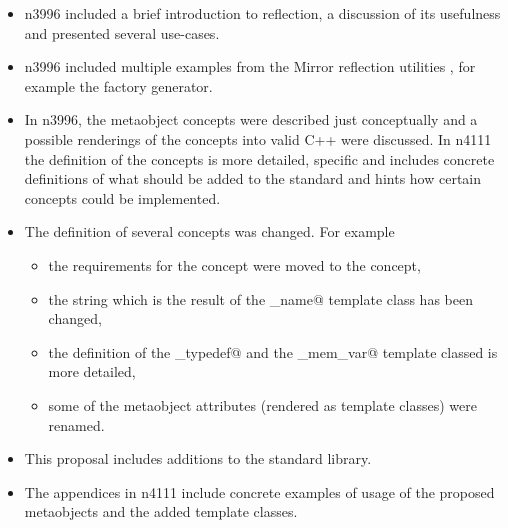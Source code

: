 \begin{itemize}
\item n3996 included a brief introduction to reflection, a discussion
of its usefulness and presented several use-cases.
\item n3996 included multiple examples from the Mirror reflection utilities
\cite{mirror-doc-cpp11}, for example the factory generator.
\item In n3996, the metaobject concepts were described just conceptually
and a possible renderings of the concepts into valid C++ were discussed.
In n4111 the definition of the concepts is more detailed, specific and includes
concrete definitions of what should be added to the standard and hints
how certain concepts could be implemented.
\item The definition of several concepts was changed. For example
  \begin{itemize}
  \item the requirements for the  concept were moved
  to the  concept,
  \item the string which is the result of the \verb@base_name@ template
  class has been changed,
  \item the definition of the \verb@named_typedef@ and the \verb@named_mem_var@
  template classed is more detailed,
  \item some of the metaobject attributes (rendered as template classes)
  were renamed.
  \end{itemize}
\item This proposal includes additions to the standard library.
\item The appendices in n4111 include concrete examples of usage
of the proposed metaobjects and the added template classes.
\end{itemize}
